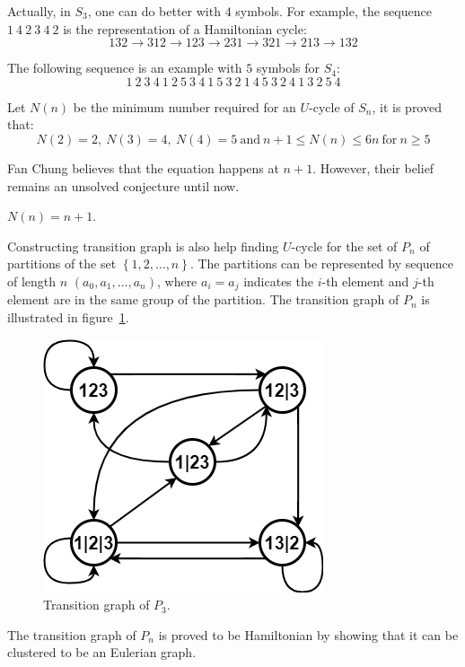 Actually, in $S_{3}$, one can do better with $4$ symbols. For example, the sequence $1\ 4\ 2\ 3\ 4\ 2$ is the representation of a Hamiltonian cycle:
\[132\rightarrow312\rightarrow123\rightarrow231\rightarrow321\rightarrow213\rightarrow132\]

The following sequence is an example with $5$ symbols for $S_{4}$:
\[1\ 2\ 3\ 4\ 1\ 2\ 5\ 3\ 4\ 1\ 5\ 3\ 2\ 1\ 4\ 5\ 3\ 2\ 4\ 1\ 3\ 2\ 5\ 4 \]

Let $N(n)$ be the minimum number required for an $U$-cycle of $S_{n}$, it is proved that:
\[N(2)=2,\ N(3) = 4,\ N(4)=5\ \mathrm{and}\ n+1\leq N(n)\leq 6n\ \mathrm{for}\ n\geq5\]

Fan Chung believes that the equation happens at $n+1$. However, their belief remains an unsolved conjecture until now.
\begin{conjecture}
    $N(n)=n+1$.
\end{conjecture}

Constructing transition graph is also help finding $U$-cycle for the set of $P_{n}$ of partitions of the set $\left\{1,2,\ldots,n\right\}$. The partitions can be represented by sequence of length $n$ $(a_{0},a_{1},\ldots,a_{n})$, where $a_{i}=a_{j}$ indicates the $i$-th element and $j$-th element are in the same group of the partition. The transition graph of $P_{n}$ is illustrated in figure~\ref{fig:P3_graph}.

\begin{figure}[htbp]
    \centering
    \includegraphics[scale=0.5]{fig/partitions.png}
    \caption{Transition graph of $P_{3}$.}
    \label{fig:P3_graph}
\end{figure}

The transition graph of $P_{n}$ is proved to be Hamiltonian by showing that it can be clustered to be an Eulerian graph. 


